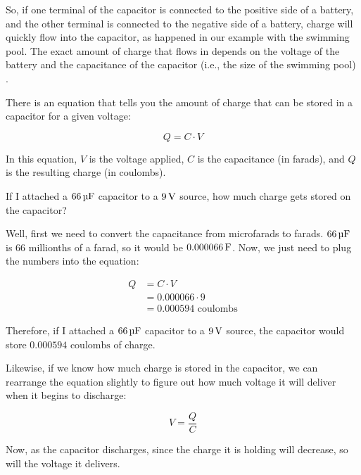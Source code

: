 
So, if one terminal of the capacitor is connected to the positive side of a battery, and the other terminal is connected to the negative side of a battery, charge will quickly flow into the capacitor, as happened in our example with the swimming pool.
The exact amount of charge that flows in depends on the voltage of the battery and the capacitance of the capacitor (i.e., the size of the swimming pool)
.

There is an equation that tells you the amount of charge that can be stored in a capacitor for a given voltage:

\begin{equation}
\label{eqBasicCapacitance}
Q = C\cdot V
\end{equation}

In this equation, $V$ is the voltage applied, $C$ is the capacitance (in farads), and $Q$ is the resulting charge (in coulombs).

\begin{exampleprob}
If I attached a $66\,\si{\micro\farad}$ capacitor to a $9\,\si{\volt}$ source, how much charge gets stored on the capacitor?

Well, first we need to convert the capacitance from microfarads to farads.  
$66\,\si{\micro\farad}$ is 66 millionths of a farad, so it would be $0.000066\,\si{\farad}$.
Now, we just need to plug the numbers into the equation:

\begin{align*}
Q &= C\cdot V \\
  &= 0.000066\cdot 9 \\
  &= 0.000594 \textrm{ coulombs}
\end{align*}

Therefore, if I attached a $66\,\si{\micro\farad}$ capacitor to a $9\,\si{\volt}$ source, the capacitor would store $0.000594 \textrm{ coulombs}$ of charge.
\end{exampleprob}

Likewise, if we know how much charge is stored in the capacitor, we can rearrange the equation slightly to figure out how much voltage it will deliver when it begins to discharge:

\begin{equation}
\label{eqCapacitanceToVoltage}
V = \frac{Q}{C}
\end{equation}

Now, as the capacitor discharges, since the charge it is holding will decrease, so will the voltage it delivers.

